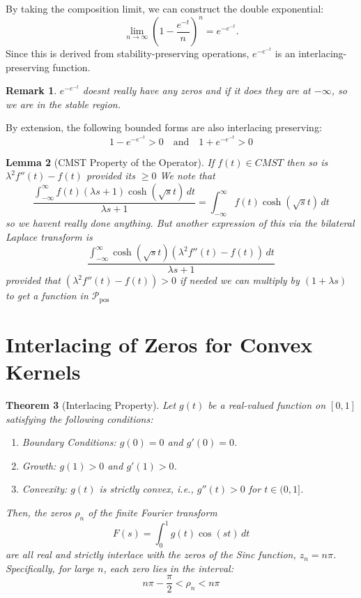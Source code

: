 \documentclass[11pt]{article}
\theoremstyle{breakdef}
\newtheorem{theorem}{Theorem}[section]
\newtheorem{lemma}[theorem]{Lemma}
\newtheorem{remark}[theorem]{Remark}
\begin{document}
By taking the composition limit, we can construct the double exponential:
\begin{equation}
\lim_{n \to \infty} \left(1 - \frac{e^{-t}}{n}\right)^n = e^{-e^{-t}}.
\end{equation}
Since this is derived from stability-preserving operations, $e^{-e^{-t}}$ is an interlacing-preserving function. 

\begin{remark}
$e^{-e^{-t}}$ doesnt really have any zeros and if it does they are at $-\infty$, so we are in the stable region.
\end{remark}

By extension, the following bounded forms are also interlacing preserving:
\begin{equation}
1 - e^{-e^{-t}} > 0 \quad \text{and} \quad 1 + e^{-e^{-t}} > 0
\end{equation}

\begin{lemma} [CMST Property of the Operator]
If $f(t) \in CMST$ then so is $\lambda^2 f ''(t) - f(t)$ provided its  $ \ge 0$
We note that
\begin{equation}
\frac{\int_{-\infty}^{\infty} f(t) (\lambda  s+1) \cosh \left(\sqrt{s} t\right) \, dt}{\lambda  s+1} = \int_{-\infty}^{\infty} f(t) \cosh \left(\sqrt{s} t\right) \, dt
\end{equation}
so we havent really done anything.  But another expression of this via the bilateral Laplace transform is
\begin{equation}
\frac{\int_{-\infty}^\infty \cosh \left(\sqrt{s} t\right) \left(\lambda^2  f''(t)-f(t)\right) \, dt}{\lambda  s+1}
\end{equation}
provided that $\left(\lambda^2  f''(t)-f(t)\right) > 0$
if needed we can multiply by $(1 + \lambda s)$ to get a function in $\mathcal{P}_{\mathrm{pos}}$
\end{lemma}



\section{Interlacing of Zeros for Convex Kernels}

\begin{theorem}[Interlacing Property]
Let $g(t)$ be a real-valued function on $[0,1]$ satisfying the following conditions:
\begin{enumerate}
    \item Boundary Conditions: $g(0) = 0$ and $g'(0) = 0$.
    \item Growth: $g(1) > 0$ and $g'(1) > 0$.
    \item Convexity: $g(t)$ is strictly convex, i.e., $g''(t) > 0$ for $t \in (0,1]$.
\end{enumerate}
Then, the zeros $\rho_n$ of the finite Fourier transform
$$ F(s) = \int_0^1 g(t) \cos(st) \, dt $$
are all real and strictly interlace with the zeros of the Sinc function, $z_n = n\pi$. Specifically, for large $n$, each zero lies in the interval:
$$ n\pi - \frac{\pi}{2} < \rho_n < n\pi $$
\end{theorem}
\end{document}
